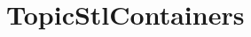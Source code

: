 \hypertarget{group___topic_stl_containers}{}\section{Topic\+Stl\+Containers}
\label{group___topic_stl_containers}
